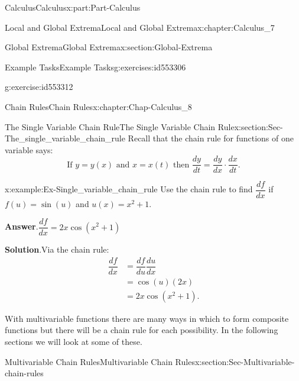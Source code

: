\documentclass[oneside,10pt,]{book}
\newcommand{\blocktitlefont}{\relax}
\numberwithin{equation}{section}
\newcommand{\amp}{&}
\begin{document}
\begin{partptx}{Calculus}{}{Calculus}{}{}{x:part:Part-Calculus}
\begin{chapterptx}{Local and Global Extrema}{}{Local and Global Extrema}{}{}{x:chapter:Calculus_7}
\begin{sectionptx}{Global Extrema}{}{Global Extrema}{}{}{x:section:Global-Extrema}
\begin{exercises-subsection-numberless}{Example Tasks}{}{Example Tasks}{}{}{g:exercises:id553306}
\begin{divisionexercise}{2}{}{}{g:exercise:id553312}
\end{divisionexercise}%
\end{exercises-subsection-numberless}
\end{sectionptx}
\end{chapterptx}
%
\typeout{************************************************}
\typeout{************************************************}
%
\begin{chapterptx}{Chain Rules}{}{Chain Rules}{}{}{x:chapter:Chap-Calculus_8}
%
%
\typeout{************************************************}
\typeout{************************************************}
%
\begin{sectionptx}{The Single Variable Chain Rule}{}{The Single Variable Chain Rule}{}{}{x:section:Sec-The_single_variable_chain_rule}
Recall that the chain rule for functions of one variable says:%
\begin{equation*}
\text{If } y=y(x) \text{ and } x=x(t) \text{ then } \dfrac{dy}{dt} = \dfrac{dy}{dx}\cdot \dfrac{dx}{dt}.
\end{equation*}
%
\begin{example}{}{x:example:Ex-Single_variable_chain_rule}%
Use the chain rule to find \(\dfrac{df}{dx}\) if \(f(u) = \sin(u)\) and \(u(x)=x^2+1\).%
\par\smallskip%
\noindent\textbf{\blocktitlefont Answer}.\hypertarget{g:answer:id553425}{}\quad{}\(\dfrac{df}{dx} = 2x\cos(x^2+1)\)%
\par\smallskip%
\noindent\textbf{\blocktitlefont Solution}.\hypertarget{g:solution:id553424}{}\quad{}Via the chain rule:%
\begin{alignat*}{1}
\dfrac{df}{dx} \amp = \dfrac{df}{du}\dfrac{du}{dx}\\
\quad \amp = \cos(u)(2x)\\
\quad \amp = 2x\cos(x^2+1).
\end{alignat*}
%
\end{example}
With multivariable functions there are many ways in which to form composite functions but there will be a chain rule for each possibility. In the following sections we will look at some of these.%
\end{sectionptx}
%
%
\typeout{************************************************}
\typeout{************************************************}
%
\begin{sectionptx}{Multivariable Chain Rules}{}{Multivariable Chain Rules}{}{}{x:section:Sec-Multivariable-chain-rules}

\end{sectionptx}
\end{chapterptx}
\end{partptx}
\end{document}
